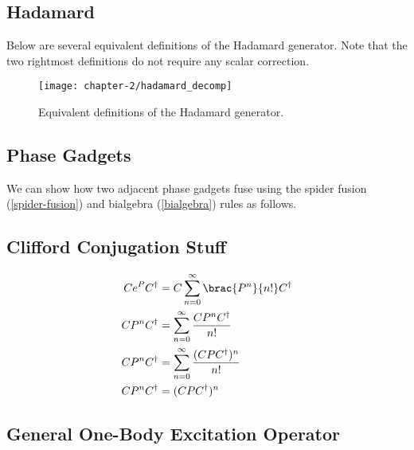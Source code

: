 \subsection{Hadamard}%
\label{appendix-hadamard}

Below are several equivalent definitions of the Hadamard generator. Note that the two rightmost definitions do not require any scalar correction.

\begin{figure}[H]
\centering
    \centering
    \texttt{[image: chapter-2/hadamard\_decomp]}
    \caption{Equivalent definitions of the Hadamard generator.}
\end{figure}


\subsection{Phase Gadgets}%
\label{appendix-phase-gadget-fusion}

We can show how two adjacent phase gadgets fuse using the spider fusion (\ref{spider-fusion}) and bialgebra (\ref{bialgebra}) rules as follows.

%


\subsection{Clifford Conjugation Stuff}%
\label{conjugation}

\begin{align*}
    Ce^PC^\dagger &= C \sum_{n=0}^\infty \brac{P^n}{n!} C^\dagger \\
    CP^nC^\dagger &= \sum_{n=0}^\infty \frac{C P^n C^\dagger}{n!} \\
    CP^nC^\dagger &= \sum_{n=0}^\infty \frac{(C P C^\dagger)^n}{n!} \\
    CP^nC^\dagger &= (CPC^\dagger)^n
\end{align*}


\subsection{General One-Body Excitation Operator}%
\label{appendix-one-body-general}


